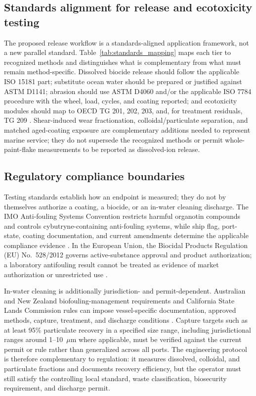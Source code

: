 \subsection{Standards alignment for release and ecotoxicity testing}
The proposed release workflow is a standards-aligned application framework, not a new parallel standard. Table~\ref{tab:standards_mapping} maps each tier to recognized methods and distinguishes what is complementary from what must remain method-specific. Dissolved biocide release should follow the applicable ISO 15181 part; substitute ocean water should be prepared or justified against ASTM D1141; abrasion should use ASTM D4060 and/or the applicable ISO 7784 procedure with the wheel, load, cycles, and coating reported; and ecotoxicity modules should map to OECD TG 201, 202, 203, and, for treatment residuals, TG 209 \cite{iso15181_1_2007,astm_d1141,astm_d4060,iso7784_1_2016,oecd_tg201,oecd_tg202,oecd_tg203,oecd_tg209}. Shear-induced wear fractionation, colloidal/particulate separation, and matched aged-coating exposure are complementary additions needed to represent marine service; they do not supersede the recognized methods or permit whole-paint-flake measurements to be reported as dissolved-ion release.

\subsection{Regulatory compliance boundaries}
Testing standards establish how an endpoint is measured; they do not by themselves authorize a coating, a biocide, or an in-water cleaning discharge. The IMO Anti-fouling Systems Convention restricts harmful organotin compounds and controls cybutryne-containing anti-fouling systems, while ship flag, port-state, coating documentation, and current amendments determine the applicable compliance evidence \cite{imo_afs_convention}. In the European Union, the Biocidal Products Regulation (EU) No.~528/2012 governs active-substance approval and product authorization; a laboratory antifouling result cannot be treated as evidence of market authorization or unrestricted use \cite{eu_bpr_528_2012}.

In-water cleaning is additionally jurisdiction- and permit-dependent. Australian and New Zealand biofouling-management requirements and California State Lands Commission rules can impose vessel-specific documentation, approved methods, capture, treatment, and discharge conditions \cite{anz_biofouling_standards,california_slc_cleaning}. Capture targets such as at least 95\% particulate recovery in a specified size range, including jurisdictional ranges around 1--10~$\mu$m where applicable, must be verified against the current permit or rule rather than generalized across all ports. The engineering protocol is therefore complementary to regulation: it measures dissolved, colloidal, and particulate fractions and documents recovery efficiency, but the operator must still satisfy the controlling local standard, waste classification, biosecurity requirement, and discharge permit.

